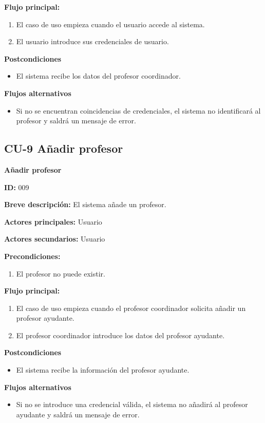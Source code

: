 \textbf{Flujo principal:}

\begin{enumerate}
	\item El caso de uso empieza cuando el usuario accede al sistema.
	\item El usuario introduce sus credenciales de usuario.
\end{enumerate}

\textbf{Postcondiciones}

\begin{itemize}
	\item El sistema recibe los datos del profesor coordinador.
\end{itemize}

\textbf{Flujos alternativos}

\begin{itemize}
	\item Si no se encuentran coincidencias de credenciales, el sistema no identificará al profesor y saldrá un mensaje de error.
\end{itemize}

\newpage
\subsection{CU-9 Añadir profesor}
\textbf{Añadir profesor}

\textbf{ID:} 009

\textbf{Breve descripción:} El sistema añade un profesor.

\textbf{Actores principales:} Usuario

\textbf{Actores secundarios:} Usuario

\textbf{Precondiciones:}

\begin{enumerate}
	\item El profesor no puede existir.
\end{enumerate}

\textbf{Flujo principal:}

\begin{enumerate}
	\item El caso de uso empieza cuando el profesor coordinador solicita añadir un profesor ayudante.
	\item El profesor coordinador introduce los datos del profesor ayudante.
\end{enumerate}

\textbf{Postcondiciones}

\begin{itemize}
	\item El sistema recibe la información del profesor ayudante.
\end{itemize}

\textbf{Flujos alternativos}

\begin{itemize}
	\item Si no se introduce una credencial válida, el sistema no añadirá al profesor ayudante y saldrá un mensaje de error.
\end{itemize}

